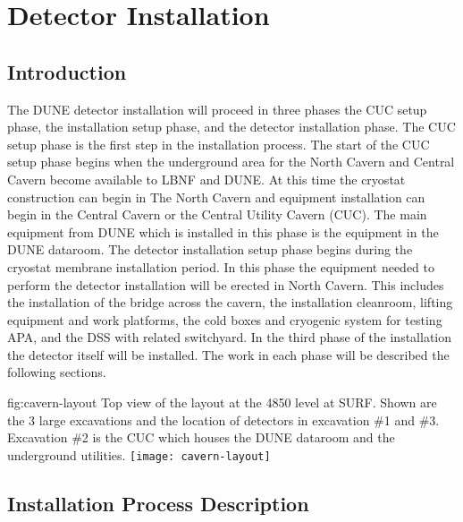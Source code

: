 \section{Detector Installation}
\label{sec:fdsp-tc-inst}

\subsection{Introduction}
\label{sec:fdsp-tc-inst-intro}

The DUNE detector installation will proceed in three phases the CUC setup phase, the installation setup phase, and the detector installation phase. The CUC setup phase is the first step in the installation process. The start of the CUC setup phase begins when the underground area for the North Cavern and Central Cavern become available to LBNF and DUNE. At this time the cryostat construction can begin in The North Cavern and equipment installation can begin in the Central Cavern or the Central Utility Cavern (CUC). The main equipment from DUNE which is installed in this phase is the equipment in the DUNE dataroom. The detector installation setup phase begins during the cryostat membrane installation period. In this phase the equipment needed to perform the detector installation will be erected in North Cavern. This includes the installation of the bridge across the cavern, the installation cleanroom, lifting equipment and work platforms, the cold boxes and cryogenic system for testing APA, and the DSS with related switchyard. In the third phase of the installation the detector itself will be installed. The work in each phase will be described the following sections.

\begin{dunefigure}{fig:cavern-layout}
  {Top view of the layout at the 4850 level at SURF. Shown are the 3 large excavations and the location of detectors in excavation \#1 and \#3. Excavation \#2 is the CUC which houses the DUNE dataroom and the underground utilities.}
\texttt{[image: cavern-layout]}
\end{dunefigure}


\subsection{Installation Process Description}
\label{sec:fdsp-tc-inst-proc}

